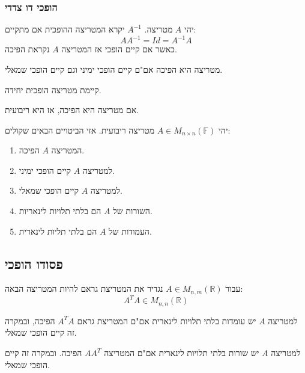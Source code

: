 \documentclass{tstextbook}
\begin{document}
\subsubsection{הופכי דו צדדי}

\begin{definition}
יהי \(A\) מטריצה. \(A^{-1}\) יקרא המטריצה ההופכית אם מתקיים:
$$AA^{-1}=Id=A^{-1}A$$
כאשר אם קיים הופכי אז המטריצה \(A\) נקראת הפיכה.

\end{definition}
\begin{corollary}
מטריצה היא הפיכה אם"ם קיים הופכי ימיני וגם קיים הופכי שמאלי.

\end{corollary}
\begin{proposition}
קיימת מטריצה הופכית יחידה.

\end{proposition}
\begin{proposition}
אם מטריצה היא הפיכה, אז היא ריבועית.

\end{proposition}
\begin{proposition}
יהי \(A \in M_{n\times n}\left( \mathbb{F}  \right)\) מטריצה ריבועית. אזי הביטויים הבאים שקולים:

  \begin{enumerate}
    \item המטריצה \(A\) הפיכה. 


    \item למטריצה \(A\) קיים הופכי ימיני. 


    \item למטריצה \(A\) קיים הופכי שמאלי. 


    \item השורות של \(A\) הם בלתי תלויות לינאריות. 


    \item העמודות של \(A\) הם בלתי תליות לינארית. 


  \end{enumerate}
\end{proposition}
\subsection{פסודו הופכי}

\begin{definition}
עבור \(A\in M_{n,m}\left( \mathbb{R} \right)\) נגדיר את המטריצת גראם להיות המטריצה הבאה:
$$A^{T}A \in M_{n,n}\left( \mathbb{R} \right)$$

\end{definition}
\begin{proposition}
למטריצה \(A\) יש עומדות בלתי תלויות לינארית אם"ם המטריצת גראם \(A^{T}A\) הפיכה, ובמקרה זה קיים הופכי שמאלי.

\end{proposition}
\begin{proposition}
למטריצה \(A\) יש שורות בלתי תלויות לינארית אם"ם המטריצה \(AA^{T}\) הפיכה. ובמקרה זה קיים הופכי שמאלי.

\end{proposition}
\end{document}

